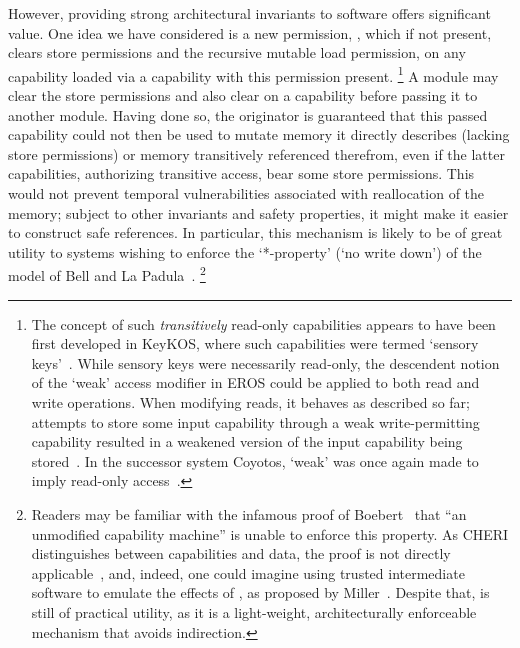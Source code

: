 However, providing strong architectural invariants to software offers
significant value.  One idea we have considered is a new permission,
\cappermRML, which if not present, clears store
permissions and the recursive mutable load permission, on any capability
loaded via a capability with this permission present.%
%
\footnote{The concept of such \emph{transitively} read-only capabilities
appears to have been first developed in KeyKOS, where such capabilities were
termed `sensory keys'~\cite{hardy:keykos}.  While sensory keys were
necessarily read-only, the descendent notion of the `weak' access modifier
in EROS could be applied to both read and write operations.  When modifying
reads, it behaves as described so far; attempts to store some input
capability through a weak write-permitting capability resulted in a
weakened version of the input capability being stored~\cite{shapiro:eros}.
In the successor system Coyotos, `weak' was once again made to imply
read-only access~\cite{doerrie2015:confinement,shapiro:coyotosspec}.}
%
A module may clear the store permissions and also clear
\cappermRML on a capability before passing it to another
module.  Having done so, the originator is guaranteed that this passed
capability could not then be used to mutate memory it directly describes
(lacking store permissions) or memory transitively referenced therefrom, even
if the latter capabilities, authorizing transitive access, bear some store
permissions.
%
This would not prevent temporal vulnerabilities
associated with reallocation of the memory; subject to other invariants
and safety properties, it might make it easier to construct safe references.
In particular, this mechanism is likely to be of great utility to systems
wishing to enforce the `*-property' (`no write down') of the model of
Bell and La Padula~\cite{B+LP76}.%
%
\footnote{Readers may be familiar with the infamous proof of
Boebert~\cite{boebert:inabilitystar} that ``an unmodified capability machine''
is unable to enforce this property.  As CHERI distinguishes between
capabilities and data, the proof is not directly
applicable~\cite{miller:capmyths}, and, indeed, one could imagine using trusted
intermediate software to emulate the effects of
\cappermRML, as proposed by
Miller~\cite{miller:paradigmregained}.  Despite that,
\cappermRML is still of practical utility, as it is a
light-weight, architecturally enforceable mechanism that avoids indirection.}

